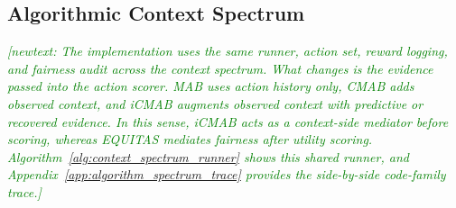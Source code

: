 \documentclass[conference]{IEEEtran}
\newcommand{\newtext}[1]{\textcolor{green}{{\it [newtext: #1]}}}
\begin{document}
\subsection{Algorithmic Context Spectrum}
\label{sec:algorithmic_context_spectrum}

\newtext{The implementation uses the same runner, action set, reward logging, and
fairness audit across the context spectrum. What changes is the evidence
passed into the action scorer. MAB uses action history only, CMAB adds observed
context, and iCMAB augments observed context with predictive or recovered
evidence. In this sense, iCMAB acts as a context-side mediator before scoring,
whereas EQUITAS mediates fairness after utility scoring.
Algorithm~\ref{alg:context_spectrum_runner} shows this shared runner, and
Appendix~\ref{app:algorithm_spectrum_trace} provides the side-by-side
code-family trace.}
\end{document}
